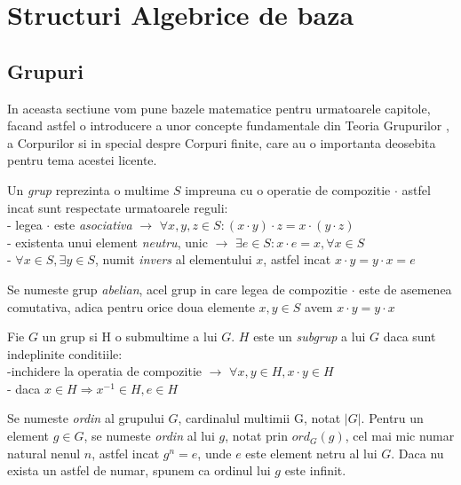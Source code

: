 %
%
\let\textcircled=\pgftextcircled

\chapter{Structuri Algebrice de baza} 
\section{Grupuri}
\label{sec:sec01}
In aceasta sectiune vom pune bazele matematice pentru urmatoarele capitole, facand astfel o introducere a unor concepte fundamentale din Teoria Grupurilor , a Corpurilor si in special despre Corpuri finite, care au o importanta deosebita pentru tema acestei licente.
\begin{dfn}
Un \textit{grup} reprezinta o multime $S$ impreuna cu o operatie de compozitie $\cdot$ astfel incat sunt respectate urmatoarele reguli:
\\ - legea $\cdot$ este \textit{asociativa} $\rightarrow$ $\forall x, y, z\in S: (x\cdot y)\cdot z = x\cdot (y \cdot z)$
\\ - existenta unui element \textit{neutru}, unic $\rightarrow$ $\exists e\in S: x \cdot e = x, \forall x\in S$
\\ - $\forall x\in S, \exists y\in S$, numit \textit{invers} al elementului $x$, astfel incat $x\cdot y = y\cdot x = e$
\end{dfn}

\begin{dfn}
Se numeste grup \textit{abelian}, acel grup in care legea de compozitie $\cdot$ este de asemenea comutativa, adica pentru orice doua elemente
$x, y \in S$ avem $x \cdot y = y \cdot x$
\end{dfn}

\begin{dfn}
Fie $G$ un grup si H o submultime a lui $G$. $H$ este un \textit{subgrup} a lui $G$ daca sunt indeplinite conditiile:
\\ -inchidere la operatia de compozitie $\rightarrow$ $\forall x, y \in H, x \cdot y \in H$
\\ - daca $x \in H \Rightarrow x^{-1} \in H, e \in H$
\end{dfn}

\begin{dfn}
Se numeste \textit{ordin} al grupului $G$, cardinalul multimii G, notat $|G|$. Pentru un element $g \in G$, se numeste \textit{ordin} al lui $g$, notat prin $ord_G(g)$, cel mai
mic numar natural nenul $n$, astfel incat $g^n = e$, unde $e$ este element netru al lui $G$. Daca nu exista un astfel de numar, spunem ca ordinul lui $g$ este infinit.
\end{dfn}

